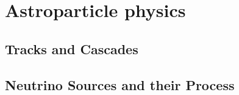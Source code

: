 \chapter{Astroparticle physics}

\section{Tracks and Cascades}

\section{Neutrino Sources and their Process}
